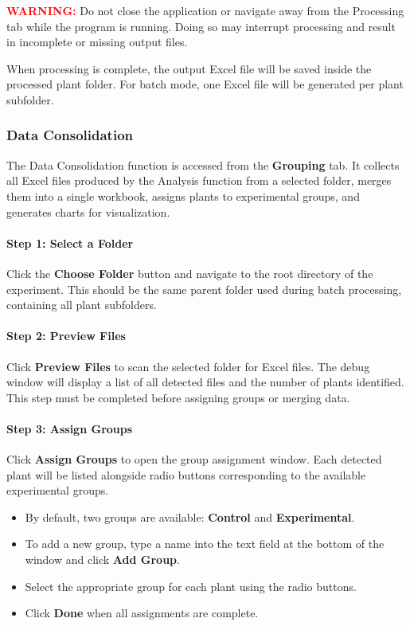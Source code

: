\documentclass[12pt,a4paper,oneside]{report}
\begin{document}
\noindent
\textcolor{red}{\textbf{WARNING:}}
Do not close the application or navigate away from the Processing tab while the program is running. Doing so may interrupt processing and result in incomplete or missing output files.

\vspace{0.5cm}

When processing is complete, the output Excel file will be saved inside the processed plant folder. For batch mode, one Excel file will be generated per plant subfolder.

\subsubsection{Data Consolidation}

The Data Consolidation function is accessed from the \textbf{Grouping} tab. It collects all Excel files produced by the Analysis function from a selected folder, merges them into a single workbook, assigns plants to experimental groups, and generates charts for visualization.

\paragraph{Step 1: Select a Folder}

Click the \textbf{Choose Folder} button and navigate to the root directory of the experiment. This should be the same parent folder used during batch processing, containing all plant subfolders.

\paragraph{Step 2: Preview Files}

Click \textbf{Preview Files} to scan the selected folder for Excel files. The debug window will display a list of all detected files and the number of plants identified. This step must be completed before assigning groups or merging data.

\paragraph{Step 3: Assign Groups}

Click \textbf{Assign Groups} to open the group assignment window. Each detected plant will be listed alongside radio buttons corresponding to the available experimental groups.

\begin{itemize}
    \item By default, two groups are available: \textbf{Control} and \textbf{Experimental}.
    \item To add a new group, type a name into the text field at the bottom of the window and click \textbf{Add Group}.
    \item Select the appropriate group for each plant using the radio buttons.
    \item Click \textbf{Done} when all assignments are complete.
\end{itemize}
\end{document}
